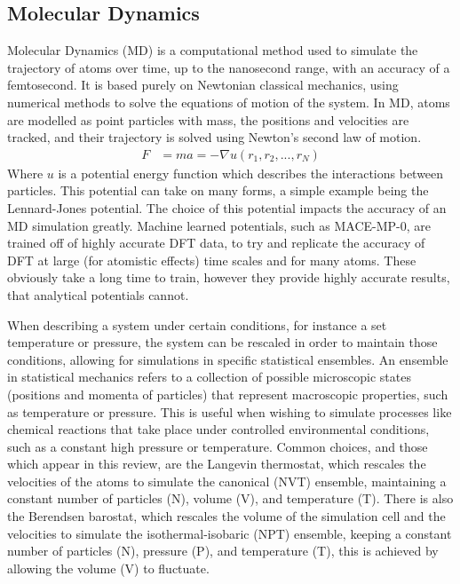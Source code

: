 \documentclass[10pt,a4paper,twocolumn,twoside]{extarticle}
\begin{document}
\subsection{Molecular Dynamics}
Molecular Dynamics (MD) is a computational method used to simulate the trajectory of atoms over time, up to the nanosecond range, with an accuracy of a femtosecond. It is based purely on Newtonian classical mechanics, using numerical methods to solve the equations of motion of the system. In MD, atoms are modelled as point particles with mass, the positions and velocities are tracked, and their trajectory is solved using Newton's second law of motion.
\begin{align*}
	F &= ma = -\nabla u(r_1, r_2, ..., r_N)
\end{align*}
Where $u$ is a potential energy function which describes the interactions between particles. This potential can take on many forms, a simple example being the Lennard-Jones potential. The choice of this potential impacts the accuracy of an MD simulation greatly. Machine learned potentials, such as MACE-MP-0\cite{MACE}, are trained off of highly accurate DFT data, to try and replicate the accuracy of DFT at large (for atomistic effects) time scales and for many atoms. These obviously take a long time to train, however they provide highly accurate results, that analytical potentials cannot. 


When describing a system under certain conditions, for instance a set temperature or pressure, the system can be rescaled in order to maintain those conditions, allowing for simulations in specific statistical ensembles. An ensemble in statistical mechanics refers to a collection of possible microscopic states (positions and momenta of particles) that represent macroscopic properties, such as temperature or pressure. This is useful when wishing to simulate processes like chemical reactions that take place under controlled environmental conditions, such as a constant high pressure or temperature. Common choices, and those which appear in this review, are the Langevin thermostat, which rescales the velocities of the atoms to simulate the canonical (NVT) ensemble, maintaining a constant number of particles (N), volume (V), and temperature (T). There is also the Berendsen barostat, which rescales the volume of the simulation cell and the velocities to simulate the isothermal-isobaric (NPT) ensemble, keeping a constant number of particles (N), pressure (P), and temperature (T), this is achieved by allowing the volume (V) to fluctuate.
\end{document}
